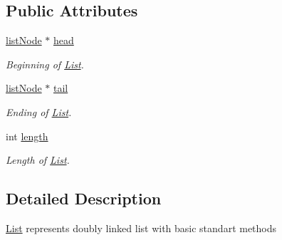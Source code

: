 \subsection*{Public Attributes}
\begin{DoxyCompactItemize}
\item 
\hypertarget{class_list_a12cd01438d288ba6ade07243fdd3ce43}{\hyperlink{classlist_node}{list\-Node} $\ast$ \hyperlink{class_list_a12cd01438d288ba6ade07243fdd3ce43}{head}}\label{class_list_a12cd01438d288ba6ade07243fdd3ce43}

\begin{DoxyCompactList}\small\item\em Beginning of \hyperlink{class_list}{List}. \end{DoxyCompactList}\item 
\hypertarget{class_list_a7b36541bddd03b2981439803449f4861}{\hyperlink{classlist_node}{list\-Node} $\ast$ \hyperlink{class_list_a7b36541bddd03b2981439803449f4861}{tail}}\label{class_list_a7b36541bddd03b2981439803449f4861}

\begin{DoxyCompactList}\small\item\em Ending of \hyperlink{class_list}{List}. \end{DoxyCompactList}\item 
\hypertarget{class_list_a27209fb8022bf00b3e90ffdfc91fda18}{int \hyperlink{class_list_a27209fb8022bf00b3e90ffdfc91fda18}{length}}\label{class_list_a27209fb8022bf00b3e90ffdfc91fda18}

\begin{DoxyCompactList}\small\item\em Length of \hyperlink{class_list}{List}. \end{DoxyCompactList}\end{DoxyCompactItemize}


\subsection{Detailed Description}
\hyperlink{class_list}{List} represents doubly linked list with basic standart methods 

